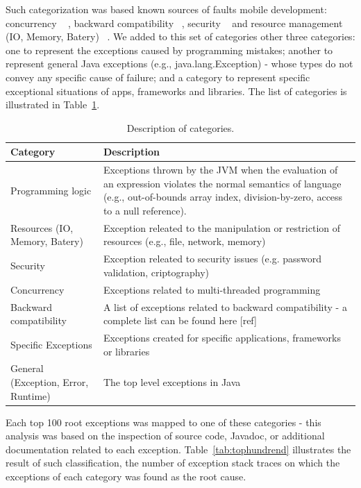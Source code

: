 \documentclass[conference]{IEEEtran}
\begin{document}
Such categorization was based known sources of faults mobile development: concurrency ~\cite{ama2012}
, backward compatibility  ~\cite{McDon13}, security   ~\cite{enck2011study,was2010} and resource management (IO, Memory, Batery) ~\cite{Zhang12}.
We added to this set of categories other three categories: one to represent the exceptions caused by programming mistakes;
  another to represent general Java exceptions (e.g., java.lang.Exception) - whose types do not convey any specific cause of failure; and a category to
represent specific  exceptional situations of apps, frameworks and libraries.
The list of categories is illustrated in Table~\ref{tab:categories}. 

\begin{table}
  \centering
  \begin{tabular}{|p{2cm}| p{5cm}|}
    \hline
    \bfseries{Category} & \bfseries{Description} \\
    \hline
      Programming logic &  Exceptions thrown by the JVM when the 
evaluation of an expression violates the normal semantics of language (e.g., 
out-of-bounds array index, division-by-zero, access to a null reference). \\ \hline
      Resources (IO, Memory, Batery)  & Exception releated to the manipulation or restriction of resources (e.g., file, network, memory) \\ \hline
      Security                               & Exception releated to security issues (e.g. password validation, criptography) \\ \hline
      Concurrency                            & Exceptions related to multi-threaded programming \\ \hline
      Backward compatibility                 &  A list of exceptions related to backward compatibility - a complete list can be found here [ref]  \\ \hline
      Specific Exceptions              & Exceptions created for specific applications, frameworks or libraries \\ \hline
      General (Exception, Error, Runtime)    & The top level exceptions in Java    \\ \hline
    \hline
  \end{tabular}
  \caption{Description of categories.}
  \label{tab:categories}
\end{table}

Each top 100 root exceptions was mapped to one of these categories - 
this analysis was based on the inspection of source code, Javadoc, or additional 
documentation related to each exception.  Table~\ref{tab:tophundrend} 
illustrates the result of such classification, the number of exception stack traces
on which the exceptions of each category was found as the root cause.
\end{document}
